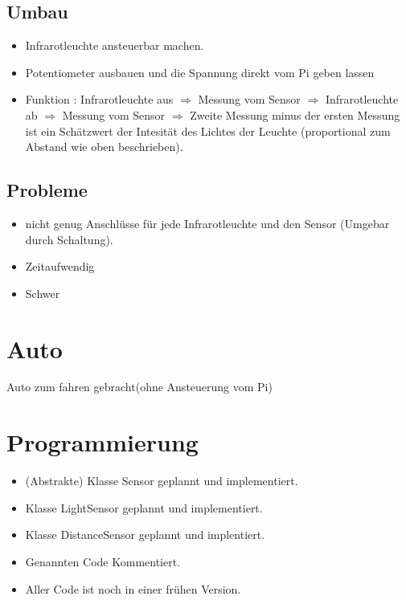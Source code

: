 \documentclass{article}
\begin{document}
\subsection{Umbau}

\begin{itemize}

\item Infrarotleuchte ansteuerbar machen.

\item Potentiometer ausbauen und die Spannung direkt vom Pi geben lassen 

\item Funktion : Infrarotleuchte aus $\Rightarrow$ Messung vom Sensor $\Rightarrow$ Infrarotleuchte ab $\Rightarrow$ Messung vom Sensor $\Rightarrow$ Zweite Messung minus der ersten Messung ist ein Schätzwert der Intesität des Lichtes der Leuchte (proportional zum Abstand wie oben beschrieben).

\end{itemize}

\subsection{Probleme}

\begin{itemize}

\item nicht genug Anschlüsse für jede Infrarotleuchte und den Sensor (Umgebar durch Schaltung).

\item Zeitaufwendig 

\item Schwer

\end{itemize}

\section{Auto}

Auto zum fahren gebracht(ohne Ansteuerung vom Pi)

\section{Programmierung}

\begin{itemize}

\item (Abstrakte) Klasse Sensor geplannt und implementiert.

\item Klasse LightSensor geplannt und implementiert.

\item Klasse DistanceSensor geplannt und implentiert.

\item Genannten Code Kommentiert.

\item Aller Code ist noch in einer frühen Version.

\end{itemize}
\end{document}
